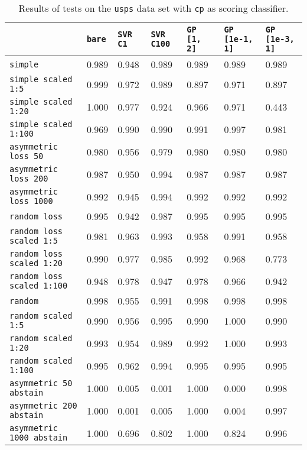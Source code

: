 \begin{table}
{\scriptsize
\begin{tabu}{l|l|l|l|l|l|l}
&\texttt{bare} &\texttt{SVR C1} &\texttt{SVR C100} &\texttt{GP [1, 2]} &\texttt{GP [1e-1, 1]} &\texttt{GP [1e-3, 1]}  \\
\hline
\texttt{simple} &0.989 &0.948 &0.989 &0.989 &0.989 &0.989 \\
\texttt{simple scaled 1:5} &0.999 &0.972 &0.989 &0.897 &0.971 &0.897 \\
\texttt{simple scaled 1:20} &1.000 &0.977 &0.924 &0.966 &0.971 &0.443 \\
\texttt{simple scaled 1:100} &0.969 &0.990 &0.990 &0.991 &0.997 &0.981 \\
\texttt{asymmetric loss 50} &0.980 &0.956 &0.979 &0.980 &0.980 &0.980 \\
\texttt{asymmetric loss 200} &0.987 &0.950 &0.994 &0.987 &0.987 &0.987 \\
\texttt{asymmetric loss 1000} &0.992 &0.945 &0.994 &0.992 &0.992 &0.992 \\
\texttt{random loss} &0.995 &0.942 &0.987 &0.995 &0.995 &0.995 \\
\texttt{random loss scaled 1:5} &0.981 &0.963 &0.993 &0.958 &0.991 &0.958 \\
\texttt{random loss scaled 1:20} &0.990 &0.977 &0.985 &0.992 &0.968 &0.773 \\
\texttt{random loss scaled 1:100} &0.948 &0.978 &0.947 &0.978 &0.966 &0.942 \\
\texttt{random} &0.998 &0.955 &0.991 &0.998 &0.998 &0.998 \\
\texttt{random scaled 1:5} &0.990 &0.956 &0.995 &0.990 &1.000 &0.990 \\
\texttt{random scaled 1:20} &0.993 &0.954 &0.989 &0.992 &1.000 &0.993 \\
\texttt{random scaled 1:100} &0.995 &0.962 &0.994 &0.995 &0.995 &0.995 \\
\texttt{asymmetric 50 abstain} &1.000 &0.005 &0.001 &1.000 &0.000 &0.998 \\
\texttt{asymmetric 200 abstain} &1.000 &0.001 &0.005 &1.000 &0.004 &0.997 \\
\texttt{asymmetric 1000 abstain} &1.000 &0.696 &0.802 &1.000 &0.824 &0.996 \\
\end{tabu} }
\caption{Results of tests on the \texttt{usps} data set
         with \texttt{cp} as scoring classifier.}
\end{table}

